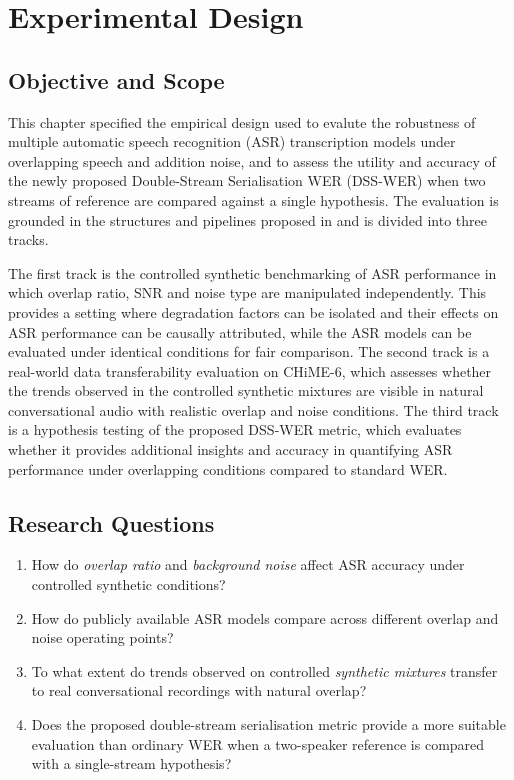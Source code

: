 

\chapter{Experimental Design}
\label{chap:experimental_design}

\section{Objective and Scope}
This chapter specified the empirical design used to evalute the robustness of multiple automatic speech recognition (ASR) transcription models under overlapping speech and addition noise, and to assess the utility and accuracy of the newly proposed Double-Stream Serialisation WER (DSS-WER) when two streams of reference are compared against a single hypothesis. The evaluation is grounded in the structures and pipelines proposed in  and is divided into three tracks.

The first track is the controlled synthetic benchmarking of ASR performance in which overlap ratio, SNR and noise type are manipulated independently. This provides a setting where degradation factors can be isolated and their effects on ASR performance can be causally attributed, while the ASR models can be evaluated under identical conditions for fair comparison. The second track is a real-world data transferability evaluation on CHiME-6, which assesses whether the trends observed in the controlled synthetic mixtures are visible in natural conversational audio with realistic overlap and noise conditions. The third track is a hypothesis testing of the proposed DSS-WER metric, which evaluates whether it provides additional insights and accuracy in quantifying ASR performance under overlapping conditions compared to standard WER.


\section{Research Questions}
\label{sec:research_questions}
\begin{enumerate}[label=\textbf{RQ\arabic*:}, leftmargin=*]
    \item How do \emph{overlap ratio} and \emph{background noise} affect ASR accuracy under controlled synthetic conditions?
    \item How do publicly available ASR models compare across different overlap and noise operating points?
    \item To what extent do trends observed on controlled \emph{synthetic mixtures} transfer to real conversational recordings with natural overlap?
    \item Does the proposed double-stream serialisation metric provide a more suitable evaluation than ordinary WER when a two-speaker reference is compared with a single-stream hypothesis?
\end{enumerate}

